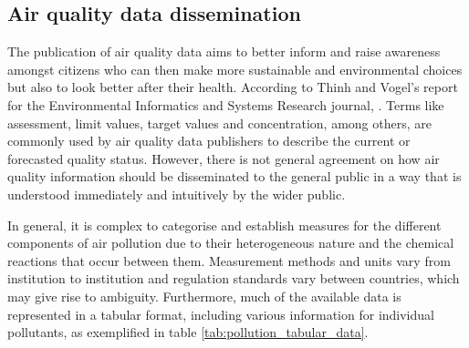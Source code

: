 \subsection{Air quality data dissemination}
The publication of air quality data aims to better inform and raise awareness amongst citizens who can then make more sustainable and environmental choices but also to look better after their health. According to Thinh and Vogel’s report for the Environmental Informatics and Systems Research journal,  \cite{Thinh2007}. Terms like assessment, limit values, target values and concentration, among others, are commonly used by air quality data publishers to describe the current or forecasted quality status. However, there is not general agreement on how air quality information should be disseminated to the general public in a way that is understood immediately and intuitively by the wider public. 

In general, it is complex to categorise and establish measures for the different components of air pollution due to their heterogeneous nature and the chemical reactions that occur between them. Measurement methods and units vary from institution to institution and regulation standards vary between countries, which may give rise to ambiguity. Furthermore, much of the available data is represented in a tabular format, including various information for individual pollutants, as exemplified in table \ref{tab:pollution_tabular_data}. 

